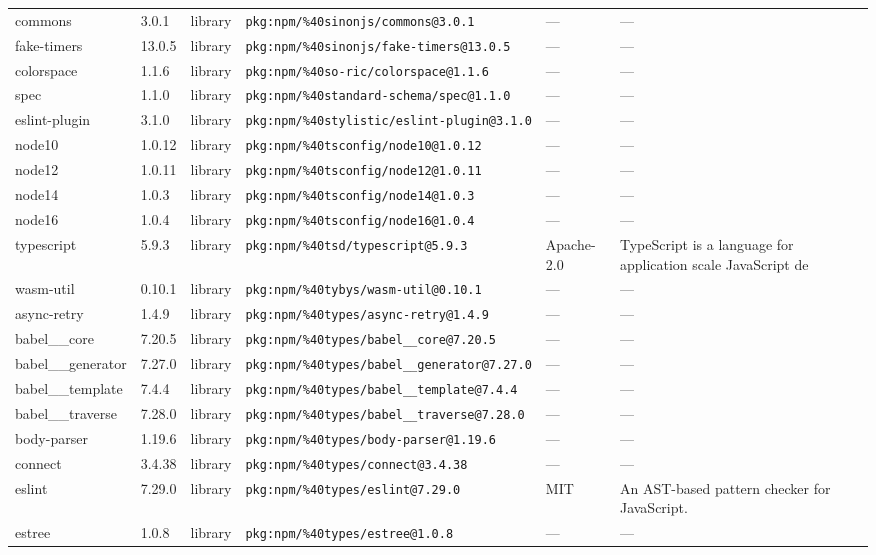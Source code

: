 \documentclass[11pt]{article}
\begin{document}
\begin{longtable}{|l|l|l|p{2.2cm}|l|p{4cm}|}
commons & 3.0.1 & library & \texttt{pkg:npm/\%40sinonjs/commons@3.0.1} & — & — \\
fake-timers & 13.0.5 & library & \texttt{pkg:npm/\%40sinonjs/fake-timers@13.0.5} & — & — \\
colorspace & 1.1.6 & library & \texttt{pkg:npm/\%40so-ric/colorspace@1.1.6} & — & — \\
spec & 1.1.0 & library & \texttt{pkg:npm/\%40standard-schema/spec@1.1.0} & — & — \\
eslint-plugin & 3.1.0 & library & \texttt{pkg:npm/\%40stylistic/eslint-plugin@3.1.0} & — & — \\
node10 & 1.0.12 & library & \texttt{pkg:npm/\%40tsconfig/node10@1.0.12} & — & — \\
node12 & 1.0.11 & library & \texttt{pkg:npm/\%40tsconfig/node12@1.0.11} & — & — \\
node14 & 1.0.3 & library & \texttt{pkg:npm/\%40tsconfig/node14@1.0.3} & — & — \\
node16 & 1.0.4 & library & \texttt{pkg:npm/\%40tsconfig/node16@1.0.4} & — & — \\
typescript & 5.9.3 & library & \texttt{pkg:npm/\%40tsd/typescript@5.9.3} & Apache-2.0 & TypeScript is a language for application scale JavaScript de \\
wasm-util & 0.10.1 & library & \texttt{pkg:npm/\%40tybys/wasm-util@0.10.1} & — & — \\
async-retry & 1.4.9 & library & \texttt{pkg:npm/\%40types/async-retry@1.4.9} & — & — \\
babel\_\_core & 7.20.5 & library & \texttt{pkg:npm/\%40types/babel\_\_core@7.20.5} & — & — \\
babel\_\_generator & 7.27.0 & library & \texttt{pkg:npm/\%40types/babel\_\_generator@7.27.0} & — & — \\
babel\_\_template & 7.4.4 & library & \texttt{pkg:npm/\%40types/babel\_\_template@7.4.4} & — & — \\
babel\_\_traverse & 7.28.0 & library & \texttt{pkg:npm/\%40types/babel\_\_traverse@7.28.0} & — & — \\
body-parser & 1.19.6 & library & \texttt{pkg:npm/\%40types/body-parser@1.19.6} & — & — \\
connect & 3.4.38 & library & \texttt{pkg:npm/\%40types/connect@3.4.38} & — & — \\
eslint & 7.29.0 & library & \texttt{pkg:npm/\%40types/eslint@7.29.0} & MIT & An AST-based pattern checker for JavaScript. \\
estree & 1.0.8 & library & \texttt{pkg:npm/\%40types/estree@1.0.8} & — & — \\

\end{longtable}
\end{document}
